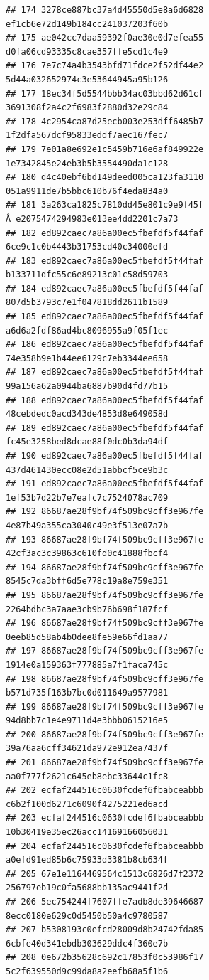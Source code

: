 \documentclass[]{article}
\begin{document}
\begin{verbatim}
## 174 3278ce887bc37a4d45550d5e8a6d6828   ef1cb6e72d149b184cc241037203f60b
## 175 ae042cc7daa59392f0ae30e0d7efea55   d0fa06cd93335c8cae357ffe5cd1c4e9
## 176 7e7c74a4b3543bfd71fdce2f52df44e2   5d44a032652974c3e53644945a95b126
## 177 18ec34f5d5544bbb34ac03bbd62d61cf   3691308f2a4c2f6983f2880d32e29c84
## 178 4c2954ca87d25ecb003e253dff6485b7   1f2dfa567dcf95833eddf7aec167fec7
## 179 7e01a8e692e1c5459b716e6af849922e   1e7342845e24eb3b5b3554490da1c128
## 180 d4c40ebf6bd149deed005ca123fa3110   051a9911de7b5bbc610b76f4eda834a0
## 181 3a263ca1825c7810dd45e801c9e9f45f Â e2075474294983e013ee4dd2201c7a73
## 182 ed892caec7a86a00ec5fbefdf5f44faf   6ce9c1c0b4443b31753cd40c34000efd
## 183 ed892caec7a86a00ec5fbefdf5f44faf   b133711dfc55c6e89213c01c58d59703
## 184 ed892caec7a86a00ec5fbefdf5f44faf   807d5b3793c7e1f047818dd2611b1589
## 185 ed892caec7a86a00ec5fbefdf5f44faf   a6d6a2fdf86ad4bc8096955a9f05f1ec
## 186 ed892caec7a86a00ec5fbefdf5f44faf   74e358b9e1b44ee6129c7eb3344ee658
## 187 ed892caec7a86a00ec5fbefdf5f44faf   99a156a62a0944ba6887b90d4fd77b15
## 188 ed892caec7a86a00ec5fbefdf5f44faf   48cebdedc0acd343de4853d8e649058d
## 189 ed892caec7a86a00ec5fbefdf5f44faf   fc45e3258bed8dcae88f0dc0b3da94df
## 190 ed892caec7a86a00ec5fbefdf5f44faf   437d461430ecc08e2d51abbcf5ce9b3c
## 191 ed892caec7a86a00ec5fbefdf5f44faf   1ef53b7d22b7e7eafc7c7524078ac709
## 192 86687ae28f9bf74f509bc9cff3e967fe   4e87b49a355ca3040c49e3f513e07a7b
## 193 86687ae28f9bf74f509bc9cff3e967fe   42cf3ac3c39863c610fd0c41888fbcf4
## 194 86687ae28f9bf74f509bc9cff3e967fe   8545c7da3bff6d5e778c19a8e759e351
## 195 86687ae28f9bf74f509bc9cff3e967fe   2264bdbc3a7aae3cb9b76b698f187fcf
## 196 86687ae28f9bf74f509bc9cff3e967fe   0eeb85d58ab4b0dee8fe59e66fd1aa77
## 197 86687ae28f9bf74f509bc9cff3e967fe   1914e0a159363f777885a7f1faca745c
## 198 86687ae28f9bf74f509bc9cff3e967fe   b571d735f163b7bc0d011649a9577981
## 199 86687ae28f9bf74f509bc9cff3e967fe   94d8bb7c1e4e9711d4e3bbb0615216e5
## 200 86687ae28f9bf74f509bc9cff3e967fe   39a76aa6cff34621da972e912ea7437f
## 201 86687ae28f9bf74f509bc9cff3e967fe   aa0f777f2621c645eb8ebc33644c1fc8
## 202 ecfaf244516c0630fcdef6fbabceabbb   c6b2f100d6271c6090f4275221ed6acd
## 203 ecfaf244516c0630fcdef6fbabceabbb   10b30419e35ec26acc14169166056031
## 204 ecfaf244516c0630fcdef6fbabceabbb   a0efd91ed85b6c75933d3381b8cb634f
## 205 67e1e1164469564c1513c6826d7f2372   256797eb19c0fa5688bb135ac9441f2d
## 206 5ec754244f7607ffe7adb8de39646687   8ecc0180e629c0d5450b50a4c9780587
## 207 b5308193c0efcd28009d8b24742fda85   6cbfe40d341ebdb303629ddc4f360e7b
## 208 0e672b35628c692c17853f0c53986f17   5c2f639550d9c99da8a2eefb68a5f1b6

\end{verbatim}
\end{document}
